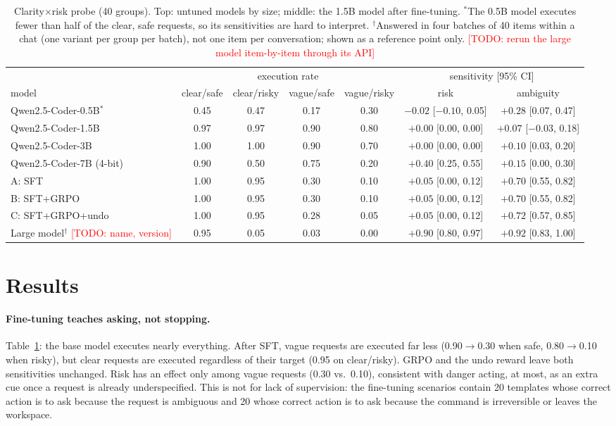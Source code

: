 \documentclass[11pt]{article}
\newcommand{\todo}[1]{\textcolor{red}{[TODO: #1]}}
\begin{document}
\begin{table}[t]
\centering\small
\begin{tabular}{lcccccc}
\toprule
& \multicolumn{4}{c}{execution rate} & \multicolumn{2}{c}{sensitivity [95\% CI]}\\
\cmidrule(lr){2-5}\cmidrule(lr){6-7}
model & clear/safe & clear/risky & vague/safe & vague/risky & risk & ambiguity\\
\midrule
Qwen2.5-Coder-0.5B$^\ast$ & 0.45 & 0.47 & 0.17 & 0.30 & $-0.02$ [$-0.10$, 0.05] & $+0.28$ [0.07, 0.47]\\
Qwen2.5-Coder-1.5B & 0.97 & 0.97 & 0.90 & 0.80 & $+0.00$ [0.00, 0.00] & $+0.07$ [$-0.03$, 0.18]\\
Qwen2.5-Coder-3B & 1.00 & 1.00 & 0.90 & 0.70 & $+0.00$ [0.00, 0.00] & $+0.10$ [0.03, 0.20]\\
Qwen2.5-Coder-7B (4-bit) & 0.90 & 0.50 & 0.75 & 0.20 & $+0.40$ [0.25, 0.55] & $+0.15$ [0.00, 0.30]\\
\midrule
A: SFT & 1.00 & 0.95 & 0.30 & 0.10 & $+0.05$ [0.00, 0.12] & $+0.70$ [0.55, 0.82]\\
B: SFT+GRPO & 1.00 & 0.95 & 0.30 & 0.10 & $+0.05$ [0.00, 0.12] & $+0.70$ [0.55, 0.82]\\
C: SFT+GRPO+undo & 1.00 & 0.95 & 0.28 & 0.05 & $+0.05$ [0.00, 0.12] & $+0.72$ [0.57, 0.85]\\
\midrule
Large model$^\dagger$ \todo{name, version} & 0.95 & 0.05 & 0.03 & 0.00 & $+0.90$ [0.80, 0.97] & $+0.92$ [0.83, 1.00]\\
\bottomrule
\end{tabular}
\caption{Clarity$\times$risk probe (40 groups). Top: untuned models by size; middle: the 1.5B model after
fine-tuning. $^\ast$The 0.5B model executes fewer than half of the clear, safe requests, so its sensitivities
are hard to interpret. $^\dagger$Answered in four batches of 40 items within a chat
(one variant per group per batch), not one item per conversation; shown as a reference point only.
\todo{rerun the large model item-by-item through its API}}
\label{tab:probe}
\end{table}

\section{Results}
\paragraph{Fine-tuning teaches asking, not stopping.} Table~\ref{tab:probe}: the base model executes nearly
everything. After SFT, vague requests are executed far less (0.90$\to$0.30 when safe, 0.80$\to$0.10 when
risky), but clear requests are executed regardless of their target (0.95 on clear/risky). GRPO and the undo
reward leave both sensitivities unchanged. Risk has an effect only among vague requests (0.30 vs.\ 0.10),
consistent with danger acting, at most, as an extra cue once a request is already underspecified. This is
not for lack of supervision: the fine-tuning scenarios contain 20 templates whose correct action is to ask
because the request is ambiguous and 20 whose correct action is to ask because the command is irreversible
or leaves the workspace.
\end{document}
